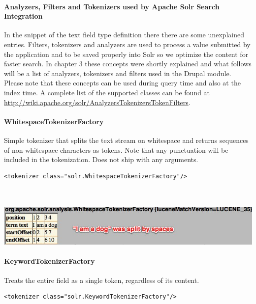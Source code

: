 \paragraph{Analyzers, Filters and Tokenizers used by Apache Solr Search Integration}
In the snippet of the text field type definition there there are some unexplained entries. Filters, tokenizers and analyzers are used to process a value submitted by the application and to be saved properly into Solr so we optimize the content for faster search. In chapter 3 these concepts were shortly explained and what follows will be a list of analyzers, tokenizers and filters used in the Drupal module. Please note that these concepts can be used during query time and also at the index time.
A complete list of the supported classes can be found at \url{http://wiki.apache.org/solr/AnalyzersTokenizersTokenFilters}.

\paragraph{}

\paragraph{WhitespaceTokenizerFactory} Simple tokenizer that splits the text stream on whitespace and returns sequences of non-whitespace characters as tokens. Note that any punctuation will be included in the tokenization. Does not ship with any arguments.
\begin{verbatim}
<tokenizer class="solr.WhitespaceTokenizerFactory"/>
\end{verbatim}
\mbox{} \\
\mbox{} \\
\includegraphics[width=\textwidth]{images/whitespacetokenizerfactory.jpg}

\paragraph{KeywordTokenizerFactory} Treats the entire field as a single token, regardless of its content.
\begin{verbatim}
<tokenizer class="solr.KeywordTokenizerFactory"/>
\end{verbatim}

